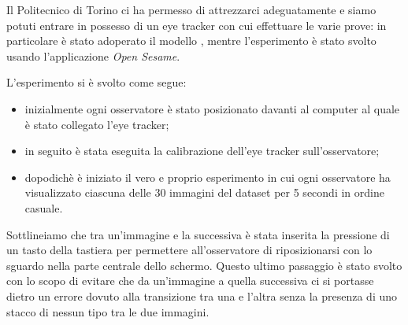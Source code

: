 \documentclass[%
	corpo=12pt,
    twoside,
    stile=classica,
    oldstyle,
    tipotesi=custom,
    greek,
    evenboxes,
]{toptesi}
\begin{document}
{Il Politecnico di Torino ci ha permesso di attrezzarci adeguatamente e siamo potuti entrare in possesso di un eye tracker con cui effettuare le varie prove: in particolare è stato adoperato il modello \href{https://www.tobiipro.com/product-listing/nano/}{}, mentre l'esperimento è stato svolto usando l'applicazione \textit{Open Sesame}.

L'esperimento si è svolto come segue: 
\begin{itemize}
\item inizialmente ogni osservatore è stato posizionato davanti al computer al quale è stato collegato l'eye tracker;
\item in seguito è stata eseguita la calibrazione dell'eye tracker sull'osservatore;
\item dopodichè è iniziato il vero e proprio esperimento in cui ogni osservatore ha visualizzato ciascuna delle 30 immagini del dataset per 5 secondi in ordine casuale.
\end{itemize}

Sottlineiamo che tra un'immagine e la successiva è stata inserita la pressione di un tasto della tastiera per permettere all'osservatore di riposizionarsi con lo sguardo nella parte centrale dello schermo. Questo ultimo passaggio è stato svolto con lo scopo di evitare che da un'immagine a quella successiva ci si portasse dietro un errore dovuto alla transizione tra una e l'altra senza la presenza di uno stacco di nessun tipo tra le due immagini.

\newpage
}
\end{document}
